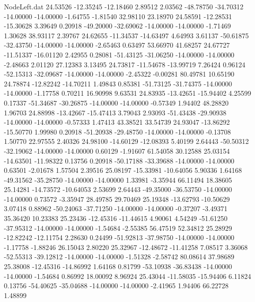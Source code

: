 \begin{filecontents}{NodeLeft.dat}
  24.53526  -12.35245  -12.18460     2.89512    2.03562  -48.78750  -34.70312  -14.00000  -14.00000   -1.64755   -1.81540   32.98110   23.18970
  24.58591  -12.28531  -15.30628     3.39649    0.20918  -49.20000  -32.69062  -14.00000  -14.00000   -1.71469    1.30628   38.93117    2.39767
  24.62655  -11.34537  -14.63497     4.64993    3.61137  -50.61875  -32.43750  -14.00000  -14.00000   -2.65463    0.63497   53.66970   41.68257
  24.67727  -11.51337  -16.01120     2.42955    0.28081  -51.43125  -31.06250  -14.00000  -14.00000   -2.48663    2.01120   27.12383    3.13495
  24.73817  -11.54678  -13.99719     7.26424    0.96124  -52.15313  -32.09687  -14.00000  -14.00000   -2.45322   -0.00281   80.49781   10.65190
  24.78874  -12.82242  -14.70211     1.49843    0.85381  -51.73125  -31.74375  -14.00000  -14.00000   -1.17758    0.70211   16.90998    9.63531
  24.83935  -13.42651  -15.94402     4.25599    0.17337  -51.34687  -30.26875  -14.00000  -14.00000   -0.57349    1.94402   48.28820    1.96703
  24.88998  -13.42667  -15.47413     3.79043    2.93093  -51.43438  -29.90938  -14.00000  -14.00000   -0.57333    1.47413   43.38521   33.54739
  24.93047  -13.86292  -15.50770     1.99980    0.20918  -51.20938  -29.48750  -14.00000  -14.00000   -0.13708    1.50770   22.97555    2.40326
  24.98100  -14.60129  -12.08393     5.40199    2.64443  -50.50312  -32.19062  -14.00000  -14.00000    0.60129   -1.91607   61.54058   30.12588
  25.03154  -14.63501  -11.98322     0.13756    0.20918  -50.17188  -33.39688  -14.00000  -14.00000    0.63501   -2.01678    1.57504    2.39516
  25.08197  -15.33981  -10.64056     5.90336    1.64168  -49.31562  -35.28750  -14.00000  -14.00000    1.33981   -3.35944   66.11494   18.38605
  25.14281  -14.73572  -10.64053     2.53699    2.64443  -49.35000  -36.53750  -14.00000  -14.00000    0.73572   -3.35947   28.49785   29.70469
  25.19348  -13.62793  -10.50629     3.07418    0.88962  -50.24063  -37.71250  -14.00000  -14.00000   -0.37207   -3.49371   35.36420   10.23383
  25.23436  -12.45316  -11.44615     4.90061    4.54249  -51.61250  -37.95312  -14.00000  -14.00000   -1.54684   -2.55385   56.47519   52.34812
  25.28929  -12.82242  -12.11754     2.28630    0.24499  -51.92813  -37.98750  -14.00000  -14.00000   -1.17758   -1.88246   26.15043    2.80220
  25.32967  -12.48672  -11.41258     7.08517    3.36068  -52.55313  -39.12812  -14.00000  -14.00000   -1.51328   -2.58742   80.08614   37.98689
  25.38008  -12.45316  -14.86992     1.64168    0.81799  -53.10938  -36.83438  -14.00000  -14.00000   -1.54684    0.86992   18.00092    8.96924
  25.43044  -11.58035  -15.94406     6.11824    0.13756  -54.40625  -35.04688  -14.00000  -14.00000   -2.41965    1.94406   66.22728    1.48899

\end{filecontents}
